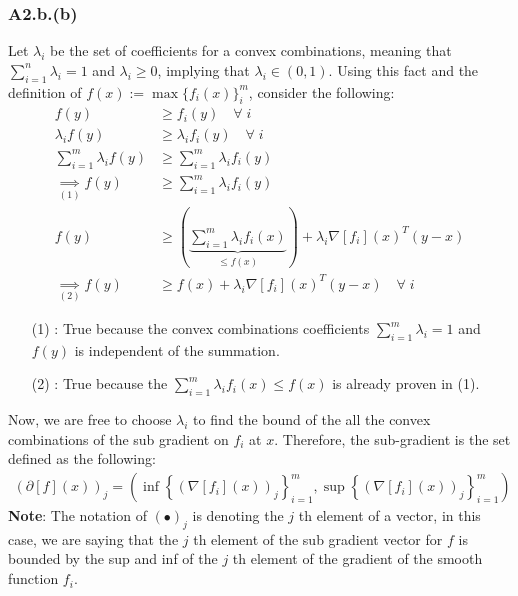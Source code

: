 \documentclass[]{article}
\begin{document}
        \subsubsection*{A2.b.(b)}
            Let $\lambda_i$ be the set of coefficients for a convex combinations, meaning that $\sum_{i = 1}^{n} \lambda_i = 1$ and $\lambda_i \ge 0$, implying that $\lambda_i \in (0, 1)$. Using this fact and the definition of $f(x):= \max\{f_i(x)\}_i^{m}$, consider the following:
            \begin{align*}\tag{A2.b.b.1}\label{eqn:A2.b.b.1}
                f(y) &\ge f_i(y) \quad \forall\; i
                \\
                \lambda_i f(y) &\ge \lambda_i f_i(y) \quad\forall\; i
                \\
                \sum_{i = 1}^{m}\lambda_i f(y) &\ge 
                \sum_{i = 1}^{m}\lambda_i f_i(y) 
                \\
                \underset{(1)}{\implies} f(y) &\ge \sum_{i = 1}^{m}\lambda_i f_i(y)
                \\
                f(y) &\ge \left(
                    \underbrace{\sum_{i = 1}^{m}\lambda_i f_i(x)}_{\le f(x)}
                \right) + \lambda_i \nabla[f_i](x)^T(y - x)
                \\
                \underset{(2)}{\implies} f(y) &\ge f(x) + \lambda_i \nabla[f_i](x)^T(y - x) \quad \forall \; i
            \end{align*}
            \begin{enumerate}
                \item[(1)]: True because the convex combinations coefficients $\sum_{i =1}^m \lambda_i = 1$ and $f(y)$ is independent of the summation. 
                \item[(2)]: True because the $\sum_{i = 1}^{m}\lambda_i f_i(x) \le f(x)$ is already proven in (1).  
            \end{enumerate}
            Now, we are free to choose $\lambda_i$ to find the bound of the all the convex combinations of the sub gradient on $f_i$ at $x$. Therefore, the sub-gradient is the set defined as the following: 
            \begin{align*}\tag{A2.b.b.2}\label{eqn:A2.b.b.2}
                (\partial[f](x))_j = \left(
                    \inf\left\lbrace
                        (\nabla[f_i](x))_j
                    \right\rbrace_{i = 1}^m ,  
                    \sup\left\lbrace
                        (\nabla[f_i](x))_j
                    \right\rbrace_{i=1}^m
                \right)
            \end{align*}
            \textbf{Note}: The notation of $(\bullet)_j$ is denoting the $j$ th element of a vector, in this case, we are saying that the $j$ th element of the sub gradient vector for $f$ is bounded by the sup and inf of the $j$ th element of the gradient of the smooth function $f_i$. 
\end{document}
